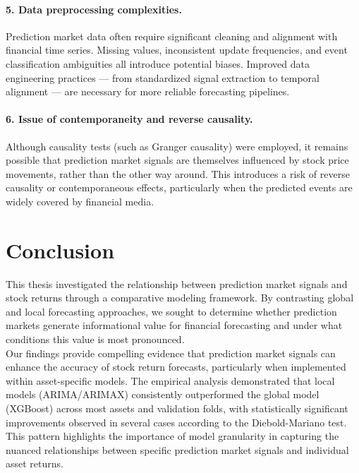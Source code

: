 \documentclass[12pt]{report}
\begin{document}
\paragraph{5. Data preprocessing complexities.}
Prediction market data often require significant cleaning and alignment with financial time series. Missing values, inconsistent update frequencies, and event classification ambiguities all introduce potential biases. Improved data engineering practices — from standardized signal extraction to temporal alignment — are necessary for more reliable forecasting pipelines.

\paragraph{6. Issue of contemporaneity and reverse causality.}
Although causality tests (such as Granger causality) were employed, it remains possible that prediction market signals are themselves influenced by stock price movements, rather than the other way around. This introduces a risk of reverse causality or contemporaneous effects, particularly when the predicted events are widely covered by financial media.



\newpage
\section{Conclusion}
This thesis investigated the relationship between prediction market signals and stock returns through a comparative modeling framework. By contrasting global and local forecasting approaches, we sought to determine whether prediction markets generate informational value for financial forecasting and under what conditions this value is most pronounced.\\

Our findings provide compelling evidence that prediction market signals can enhance the accuracy of stock return forecasts, particularly when implemented within asset-specific models. The empirical analysis demonstrated that local models (ARIMA/ARIMAX) consistently outperformed the global model (XGBoost) across most assets and validation folds, with statistically significant improvements observed in several cases according to the Diebold-Mariano test. This pattern highlights the importance of model granularity in capturing the nuanced relationships between specific prediction market signals and individual asset returns.\\
\end{document}
